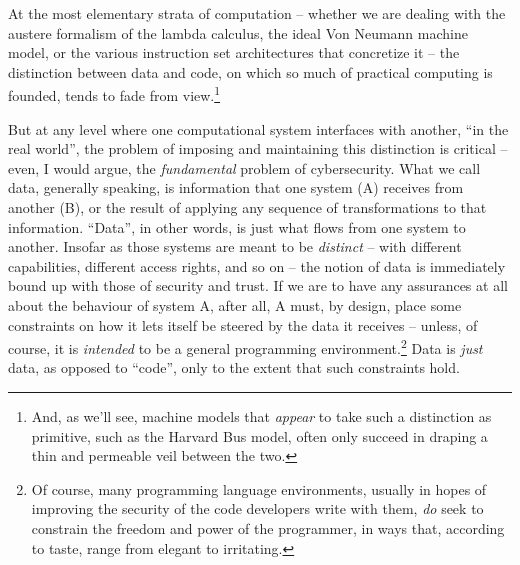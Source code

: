 \documentclass[12pt,glossary]{dalthesis}
\begin{document}
At the most elementary strata of computation -- whether we are dealing with the austere
formalism of the lambda calculus, the ideal Von Neumann machine model, or the
various instruction set architectures that concretize it -- the distinction between
data and code, on which so much of practical computing is founded, tends to
fade from view.\footnote{And, as we'll
see, machine models that \emph{appear} to take such a distinction as primitive, such
as the Harvard Bus model, often only succeed in draping a thin and permeable
veil between the two.}

But at any level where one computational system interfaces with another, ``in the
real world'', the problem of imposing and maintaining this distinction is
critical -- even, I would argue, the \emph{fundamental} problem of cybersecurity.
What we call data, generally speaking, is information that one system (A)
receives from another (B), or the result of applying any sequence of
transformations to that information. ``Data'', in other words, is just what
flows from one system to another. Insofar as those systems are meant to be
\emph{distinct} -- with different capabilities, different access rights, and so on --
the notion of data is immediately bound up with those of security and trust. 
If we are to have any assurances at
all about the behaviour of system A, after all, A must, by design, place some constraints
on how it lets itself be steered by the data it receives -- unless, of course,
it is \emph{intended} to be a general programming environment.\footnote{Of course, many programming language environments, usually in hopes
of improving the security of the code developers write with them, \emph{do} seek to
constrain the freedom and power of the programmer, in ways that, according to
taste, range from elegant to irritating.} Data is
\emph{just} data, as opposed to ``code'', only to the extent that such constraints hold.
\end{document}
